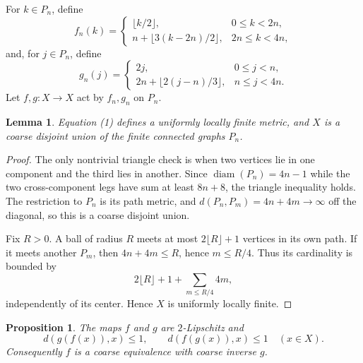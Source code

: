 \documentclass[11pt]{article}
\newtheorem{lemma}[theorem]{Lemma}
\newtheorem{proposition}[theorem]{Proposition}
\begin{document}
For $k\in P_n$, define
\[
 f_n(k)=
 \begin{cases}
 \lfloor k/2\rfloor,&0\leq k<2n,\\
 n+\lfloor3(k-2n)/2\rfloor,&2n\leq k<4n,
 \end{cases}                                                   \tag{2}
\]
and, for $j\in P_n$, define
\[
 g_n(j)=
 \begin{cases}
 2j,&0\leq j<n,\\
 2n+\lfloor2(j-n)/3\rfloor,&n\leq j<4n.
 \end{cases}                                                   \tag{3}
\]
Let $f,g:X\to X$ act by $f_n,g_n$ on $P_n$.

\begin{lemma}\label{lem:space}
Equation \emph{(1)} defines a uniformly locally finite metric, and $X$ is a
coarse disjoint union of the finite connected graphs $P_n$.
\end{lemma}

\begin{proof}
The only nontrivial triangle check is when two vertices lie in one component
and the third lies in another.  Since $\operatorname{diam}(P_n)=4n-1$ while
the two cross-component legs have sum at least $8n+8$, the triangle
inequality holds.  The restriction to $P_n$ is its path metric, and
$d(P_n,P_m)=4n+4m\to\infty$ off the diagonal, so this is a coarse disjoint
union.

Fix $R>0$.  A ball of radius $R$ meets at most $2\lfloor R\rfloor+1$
vertices in its own path.  If it meets another $P_m$, then
$4n+4m\leq R$, hence $m\leq R/4$.  Thus its cardinality is bounded by
\[
 2\lfloor R\rfloor+1+\sum_{m\leq R/4}4m,
\]
independently of its center.  Hence $X$ is uniformly locally finite.
\end{proof}

\begin{proposition}\label{prop:coarse}
The maps $f$ and $g$ are $2$-Lipschitz and
\[
 d(g(f(x)),x)\leq1,
 \qquad
 d(f(g(x)),x)\leq1
 \quad (x\in X).
\]
Consequently $f$ is a coarse equivalence with coarse inverse $g$.
\end{proposition}
\end{document}
